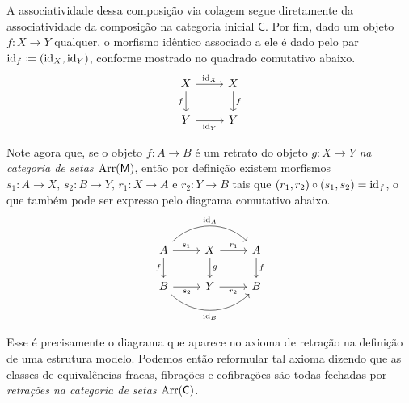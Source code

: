 \begin{obs}
  A associatividade dessa composição via colagem segue diretamente da associatividade da composição na categoria inicial $\mathsf{C}$.
  Por fim, dado um objeto $f: X \to Y$ qualquer, o morfismo idêntico associado a ele é dado pelo par $\mathrm{id}_{f} \coloneqq (\mathrm{id}_{X},\mathrm{id}_{Y})$, conforme mostrado no quadrado comutativo abaixo.
  \begin{displaymath}
    \begin{tikzcd}
      X
      \arrow[r, "\id_{X}"]
      \arrow[d, "f" swap]
      & X
      \arrow[d, "f"]
      \\ Y
      \arrow[r, "\id_{Y}" swap]
      & Y
    \end{tikzcd}
  \end{displaymath}

  Note agora que, se o objeto $f: A \to B$ é um retrato do objeto $g: X \to Y$ \emph{na categoria de setas $\mathrm{Arr}(\mathsf{M})$}, então por definição existem morfismos $s_{1}: A \to X,\, s_{2}: B \to Y,\, r_{1}: X \to A$ e $r_{2}: Y \to B$ tais que $(r_{1},r_{2}) \circ (s_{1},s_{2}) = \mathrm{id}_{f}$, o que também pode ser expresso pelo diagrama comutativo abaixo.
  \begin{displaymath}
    \begin{tikzcd}
      A
      \arrow[r, "s_{1}"]
      \arrow[d, "f" swap]
      \arrow[rr, bend left=45, "\id_{A}"]
      & X
      \arrow[r, "r_{1}"]
      \arrow[d, "g"]
      & A
      \arrow[d, "f"]
      \\ B
      \arrow[r, "s_{2}" swap]
      \arrow[rr, bend right=45, "\id_{B}" swap]
      & Y
      \arrow[r, "r_{2}" swap]
      & B
    \end{tikzcd}
  \end{displaymath}

   Esse é precisamente o diagrama que aparece no axioma de retração na definição de uma estrutura modelo.
  Podemos então reformular tal axioma dizendo que as classes de equivalências fracas, fibrações e cofibrações são todas fechadas por \emph{retrações na categoria de setas $\mathrm{Arr}(\mathsf{C})$}.
\end{obs}

